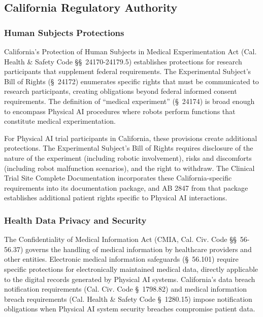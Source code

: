 \subsection{California Regulatory Authority}
\label{subsec:california-authority}

\subsubsection{Human Subjects Protections}

California's Protection of Human Subjects in Medical Experimentation Act (Cal.
Health \& Safety Code \S\S~24170-24179.5) establishes protections for research
participants that supplement federal requirements. The Experimental Subject's
Bill of Rights (\S~24172) enumerates specific rights that must be communicated
to research participants, creating obligations beyond federal informed consent
requirements. The definition of ``medical experiment'' (\S~24174) is broad
enough to encompass Physical AI procedures where robots perform functions that
constitute medical experimentation.

For Physical AI trial participants in California, these provisions create
additional protections. The Experimental Subject's Bill of Rights requires
disclosure of the nature of the experiment (including robotic involvement),
risks and discomforts (including robot malfunction scenarios), and the right to
withdraw. The Clinical Trial Site Complete Documentation \cite{site-docs}
incorporates these California-specific requirements into its documentation
package, and AB 2847 from that package establishes additional patient rights
specific to Physical AI interactions.

\subsubsection{Health Data Privacy and Security}

The Confidentiality of Medical Information Act (CMIA, Cal. Civ. Code
\S\S~56-56.37) governs the handling of medical information by healthcare
providers and other entities. Electronic medical information safeguards
(\S~56.101) require specific protections for electronically maintained medical
data, directly applicable to the digital records generated by Physical AI
systems. California's data breach notification requirements (Cal. Civ. Code
\S~1798.82) and medical information breach requirements (Cal. Health \& Safety
Code \S~1280.15) impose notification obligations when Physical AI system
security breaches compromise patient data.

